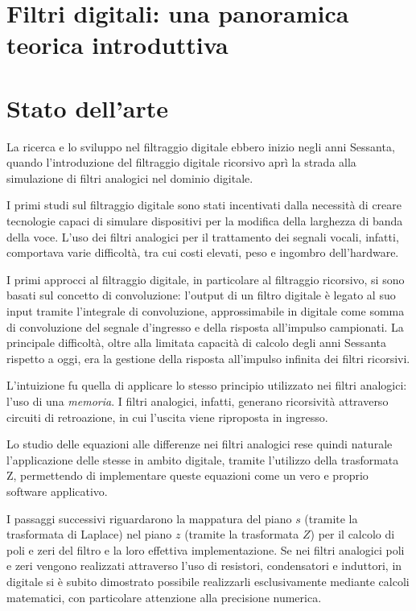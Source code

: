 \documentclass[12pt]{report}
\begin{document}
\chapter{Filtri digitali: una panoramica teorica introduttiva}
\label{cap:panoramica_introduttiva}

%
%

\chapter{Stato dell'arte}
\label{chap:stato_arte}
La ricerca e lo sviluppo nel filtraggio digitale ebbero inizio negli anni Sessanta, quando l’introduzione del filtraggio digitale ricorsivo aprì la strada alla simulazione di filtri analogici nel dominio digitale.

I primi studi sul filtraggio digitale sono stati incentivati dalla necessità di creare tecnologie capaci di simulare dispositivi per la modifica della larghezza di banda della voce. L'uso dei filtri analogici per il trattamento dei segnali vocali, infatti, comportava varie difficoltà, tra cui costi elevati, peso e ingombro dell'hardware.

I primi approcci al filtraggio digitale, in particolare al filtraggio ricorsivo, si sono basati sul concetto di convoluzione: l’output di un filtro digitale è legato al suo input tramite l’integrale di convoluzione, approssimabile in digitale come somma di convoluzione del segnale d’ingresso e della risposta all’impulso campionati. La principale difficoltà, oltre alla limitata capacità di calcolo degli anni Sessanta rispetto a oggi, era la gestione della risposta all'impulso infinita dei filtri ricorsivi.

L’intuizione fu quella di applicare lo stesso principio utilizzato nei filtri analogici: l’uso di una \textit{memoria}. I filtri analogici, infatti, generano ricorsività attraverso circuiti di retroazione, in cui l’uscita viene riproposta in ingresso.

Lo studio delle equazioni alle differenze nei filtri analogici rese quindi naturale l’applicazione delle stesse in ambito digitale, tramite l'utilizzo della trasformata Z, permettendo di implementare queste equazioni come un vero e proprio software applicativo.

I passaggi successivi riguardarono la mappatura del piano \( s \) (tramite la trasformata di Laplace) nel piano \( z \) (tramite la trasformata \( Z \)) per il calcolo di poli e zeri del filtro e la loro effettiva implementazione. Se nei filtri analogici poli e zeri vengono realizzati attraverso l’uso di resistori, condensatori e induttori, in digitale si è subito dimostrato possibile realizzarli esclusivamente mediante calcoli matematici, con particolare attenzione alla precisione numerica.
\end{document}
